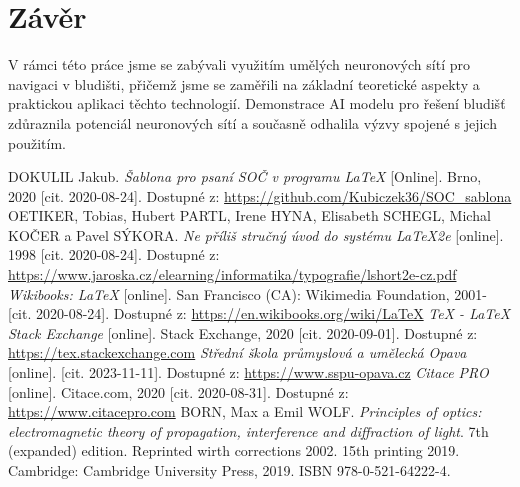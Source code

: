 \documentclass[12pt, a4paper,
twoside,        %
openright
]{report}
\begin{document}
	
	\chapter*{Závěr}
	
	V rámci této práce jsme se zabývali využitím umělých neuronových sítí pro navigaci v bludišti, přičemž jsme se zaměřili na základní teoretické aspekty a praktickou aplikaci těchto technologií. Demonstrace AI modelu pro řešení bludišť zdůraznila potenciál neuronových sítí a současně odhalila výzvy spojené s jejich použitím.
	
	\begin{thebibliography}{99}
		 DOKULIL Jakub. \textit{Šablona pro psaní SOČ v programu \LaTeX} [Online]. Brno, 2020 [cit. 2020-08-24]. Dostupné z: \url{https://github.com/Kubiczek36/SOC_sablona}
		OETIKER, Tobias, Hubert PARTL, Irene HYNA, Elisabeth SCHEGL, Michal KOČER a Pavel SÝKORA. \textit{Ne příliš stručný úvod do systému LaTeX2e} [online]. 1998 [cit. 2020-08-24]. Dostupné z: \url{https://www.jaroska.cz/elearning/informatika/typografie/lshort2e-cz.pdf}
		\textit{Wikibooks: LaTeX} [online]. San Francisco (CA): Wikimedia Foundation, 2001- [cit. 2020-08-24]. Dostupné z: \url{https://en.wikibooks.org/wiki/LaTeX}
		 \textit{TeX - LaTeX Stack Exchange} [online]. Stack Exchange, 2020 [cit. 2020-09-01]. Dostupné z: \url{https://tex.stackexchange.com}
		 \textit{Střední škola průmyslová a umělecká Opava} [online]. [cit. 2023-11-11]. Dostupné z: \url{https://www.sspu-opava.cz}
		\textit{Citace PRO} [online]. Citace.com, 2020 [cit. 2020-08-31]. Dostupné z: \url{https://www.citacepro.com}
		 BORN, Max a Emil WOLF. \textit{Principles of optics: electromagnetic theory of propagation, interference and diffraction of light}. 7th (expanded) edition. Reprinted wirth corrections 2002. 15th printing 2019. Cambridge: Cambridge University Press, 2019. ISBN 978-0-521-64222-4.
	\end{thebibliography}
	
\end{document}
